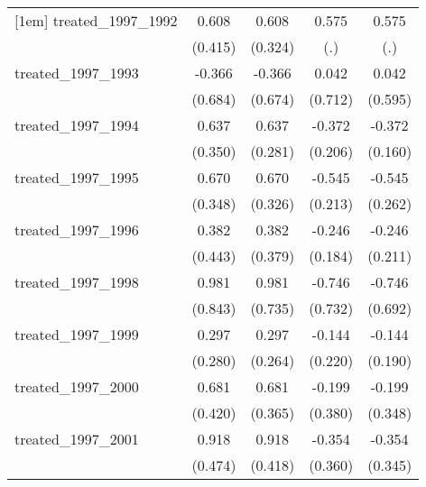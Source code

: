 {\begin{tabular}{l*{4}{c}}
[1em]
treated\_1997\_1992&       0.608         &       0.608         &       0.575         &       0.575         \\
            &     (0.415)         &     (0.324)         &         (.)         &         (.)         \\
[1em]
treated\_1997\_1993&      -0.366         &      -0.366         &       0.042         &       0.042         \\
            &     (0.684)         &     (0.674)         &     (0.712)         &     (0.595)         \\
[1em]
treated\_1997\_1994&       0.637         &       0.637\sym{*}  &      -0.372         &      -0.372\sym{*}  \\
            &     (0.350)         &     (0.281)         &     (0.206)         &     (0.160)         \\
[1em]
treated\_1997\_1995&       0.670         &       0.670\sym{*}  &      -0.545\sym{*}  &      -0.545\sym{*}  \\
            &     (0.348)         &     (0.326)         &     (0.213)         &     (0.262)         \\
[1em]
treated\_1997\_1996&       0.382         &       0.382         &      -0.246         &      -0.246         \\
            &     (0.443)         &     (0.379)         &     (0.184)         &     (0.211)         \\
[1em]
treated\_1997\_1998&       0.981         &       0.981         &      -0.746         &      -0.746         \\
            &     (0.843)         &     (0.735)         &     (0.732)         &     (0.692)         \\
[1em]
treated\_1997\_1999&       0.297         &       0.297         &      -0.144         &      -0.144         \\
            &     (0.280)         &     (0.264)         &     (0.220)         &     (0.190)         \\
[1em]
treated\_1997\_2000&       0.681         &       0.681         &      -0.199         &      -0.199         \\
            &     (0.420)         &     (0.365)         &     (0.380)         &     (0.348)         \\
[1em]
treated\_1997\_2001&       0.918         &       0.918\sym{*}  &      -0.354         &      -0.354         \\
            &     (0.474)         &     (0.418)         &     (0.360)         &     (0.345)         \\

\end{tabular}}
